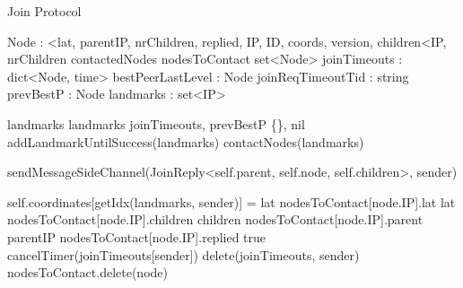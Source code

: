 
\begin{algorithm}{}
\caption{Join Protocol} \label{alg:memb:join}
\begin{algorithmic}[1]
    \asdtypes
        \State Node : <lat, parentIP, nrChildren, replied, IP, ID, coords, version, children<IP,  nrChildren\>\>
    \asdend
    \asdstate \label{alg:memb:join:state}
        \State contactedNodes 
        \State nodesToContact set<Node> 
        \State joinTimeouts : dict<Node, time> 
        \State bestPeerLastLevel : Node 
        \State joinReqTimeoutTid : string 
        \State prevBestP : Node 
        \State landmarks : set<IP> 
    \asdend

 \label{alg:memb:join:init}
    \State landmarks \asdassign landmarks 
    \State joinTimeouts, prevBestP \asdassign \{\}, nil
    {addLandmarkUntilSuccess(landmarks) \label{alg:memb:join:add_land}} 
    {contactNodes(landmarks) \label{alg:memb:join:contact_landm}} 
\asdend


 \label{alg:memb:join:recv_join}
    \State sendMessageSideChannel(JoinReply<self.parent, self.node, self.children>, sender) 
\asdend
    
  \label{alg:memb:join:recv_join_reply}
                \State self.coordinates[getIdx(landmarks, sender)] = lat
            \EndIf
            \State nodesToContact[node.IP].lat \asdassign lat
            \State nodesToContact[node.IP].children \asdassign children
            \State nodesToContact[node.IP].parent \asdassign parentIP
            \State nodesToContact[node.IP].replied \asdassign true
            \State cancelTimer(joinTimeouts[sender])
            \State delete(joinTimeouts, sender)
        \Else
            \State nodesToContact.delete(node)
        \EndIf
\asdend


\end{algorithmic}
\end{algorithm}
